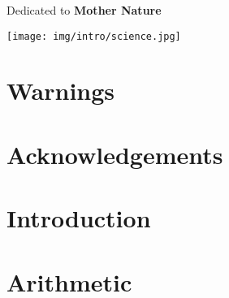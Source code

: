 \documentclass[12pt,a4paper,twoside,openright]{report}
\theoremstyle{definition}
\theoremstyle{itexmp}
\numberwithin{equation}{section}
\newenvironment{dedication}
  {\clearpage           %
   \thispagestyle{empty}%
   \vspace*{\stretch{1}}%
   \itshape             %
   \raggedleft          %
  }
  {\par %
   \vspace{\stretch{3}} %
   \clearpage           %
  }
\begin{document}
	\dominitoc
	\pagebreak
	\renewcommand{\contentsname}{Table of Contents}
	\tableofcontents
	\newpage\null\thispagestyle{empty}\newpage
	
	\setlength{\parskip}{12pt}
	\clearpage %
	\pagestyle{fancy} %
	\renewcommand{\chaptermark}[1]{\markboth{\thechapter.\space#1}{}}
	\renewcommand{\sectionmark}[1]{\markright{#1}}
	\fancyhead[LE,RO]{\nouppercase\leftmark~(\nouppercase\rightmark)} %
	\renewcommand{\footrulewidth}{1pt}
	\fancyfoot[C]{}
	\let\cleardoublepage\clearpage

	\begin{dedication}
	{\LARGE Dedicated to \textbf{Mother Nature}}
	\begin{flushright}
	\texttt{[image: img/intro/science.jpg]}
	\end{flushright}
	\end{dedication}
	

	\chapter{Warnings}
	\adjustmtc %
	\minitoc
	
	
	
	\chapter{Acknowledgements}
	

	
	\chapter{Introduction}
	
	\minitoc
	\pagebreak
	
	

   \chapter{Arithmetic}
\end{document}
